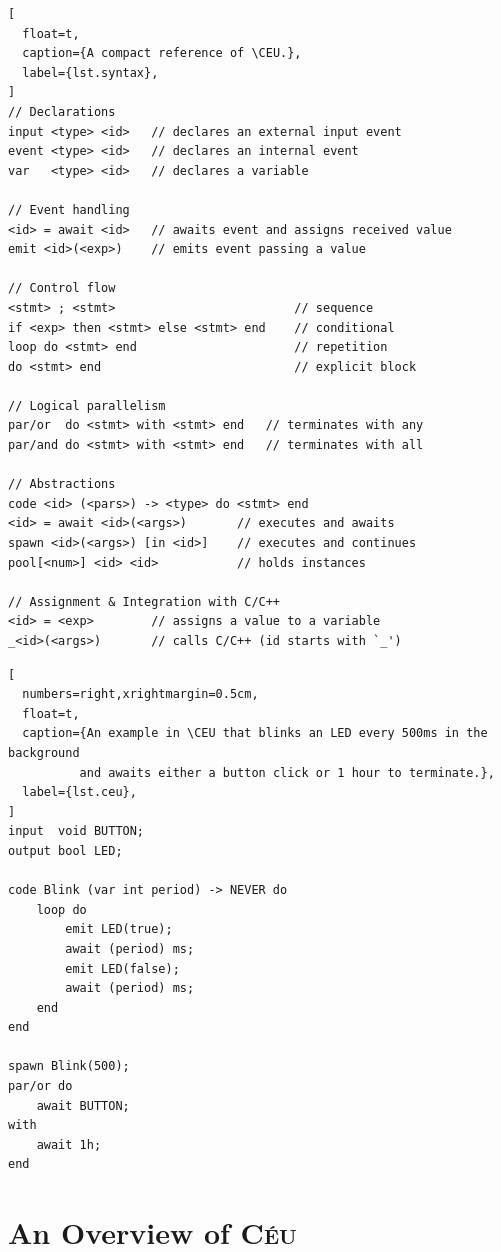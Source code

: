 \documentclass[10pt, conference, compsocconf]{IEEEtran}
\newcommand{\CEU}{\textsc{C\'{e}u}\xspace}
\begin{document}
\begin{lstlisting}[
  float=t,
  caption={A compact reference of \CEU.},
  label={lst.syntax},
]
// Declarations
input <type> <id>   // declares an external input event
event <type> <id>   // declares an internal event
var   <type> <id>   // declares a variable

// Event handling
<id> = await <id>   // awaits event and assigns received value
emit <id>(<exp>)    // emits event passing a value

// Control flow
<stmt> ; <stmt>                         // sequence
if <exp> then <stmt> else <stmt> end    // conditional
loop do <stmt> end                      // repetition
do <stmt> end                           // explicit block

// Logical parallelism
par/or  do <stmt> with <stmt> end   // terminates with any
par/and do <stmt> with <stmt> end   // terminates with all

// Abstractions
code <id> (<pars>) -> <type> do <stmt> end
<id> = await <id>(<args>)       // executes and awaits
spawn <id>(<args>) [in <id>]    // executes and continues
pool[<num>] <id> <id>           // holds instances

// Assignment & Integration with C/C++
<id> = <exp>        // assigns a value to a variable
_<id>(<args>)       // calls C/C++ (id starts with `_')
\end{lstlisting}

\begin{lstlisting}[
  numbers=right,xrightmargin=0.5cm,
  float=t,
  caption={An example in \CEU that blinks an LED every 500ms in the background
          and awaits either a button click or 1 hour to terminate.},
  label={lst.ceu},
]
input  void BUTTON;
output bool LED;

code Blink (var int period) -> NEVER do
    loop do
        emit LED(true);
        await (period) ms;
        emit LED(false);
        await (period) ms;
    end
end

spawn Blink(500);
par/or do
    await BUTTON;
with
    await 1h;
end
\end{lstlisting}

\section{An Overview of \CEU}
\label{sec.ceu}
\end{document}
